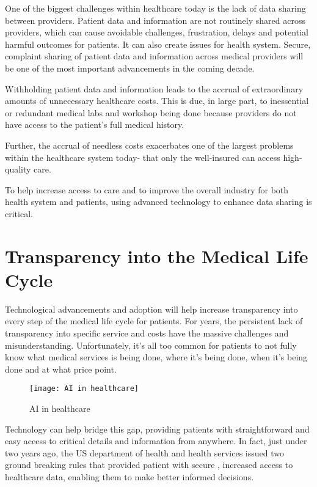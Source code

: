 \documentclass[12pt]{article}
\begin{document}
One of the biggest challenges within healthcare today is the lack of data sharing between providers. Patient data and information are not routinely shared across providers, which can cause avoidable challenges, frustration, delays and potential harmful outcomes for patients. It can also create issues for health system. Secure, complaint sharing of patient data and information across medical providers will be one of the most important advancements in the coming decade.

Withholding patient data and information leads to the accrual of extraordinary amounts of unnecessary healthcare costs. This is due, in large part, to inessential or redundant medical labs and workshop being done because providers do not have access to the patient's full medical history. 

Further, the accrual of needless costs exacerbates one of the largest problems within the healthcare system today- that only the well-insured can access high-quality care. 

To help increase access to care and to improve the overall industry for both health system and patients, using advanced technology to enhance data sharing is critical.

\section{Transparency into the Medical Life Cycle}

Technological advancements and adoption will help increase transparency into every step of the medical life cycle for patients. For years, the persistent lack of transparency into specific service and costs have the massive challenges and misunderstanding. Unfortunately, it's all too common for patients to not fully know what medical services is being done, where it's being done, when it's being done and at what price point. 

\begin{figure}[ht]
\centering
\texttt{[image: AI in healthcare]}
\caption{AI in healthcare}
\end{figure}

Technology can help bridge this gap, providing patients with straightforward and easy access to critical details and information from anywhere. In fact, just under two years ago, the US department of health and health services issued two ground breaking rules that provided patient with secure , increased access to healthcare data, enabling them to make better informed decisions.
\end{document}
